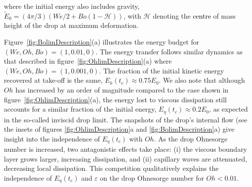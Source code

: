 \documentclass{jfm}
\newcommand{\Ohn}{\mathit{Oh}}
\newcommand{\Wen}{\mathit{We}}
\newcommand{\Bon}{\mathit{Bo}}
\newcommand{\revRev}[1]{\textcolor{black}{#1}}
\begin{document}
\noindent where the initial energy also includes gravity, $\tilde{E}_0 = (4\pi/3)\left(\Wen/2 + \Bon(1-\mathcal{H})\right)$, with $\mathcal{H}$ denoting the \revRev{centre} of mass height of the drop at maximum deformation. 

Figure~\ref{fig:BolimDescription}(a) illustrates the energy budget for $(\Wen, \Ohn, \Bon) = (1, 0.01,0)$. The energy transfer follows similar dynamics as that described in figure~\ref{fig:OhlimDescription}(a) where $(\Wen, \Ohn, \Bon) = (1, 0.001, 0)$. The fraction of the initial kinetic energy recovered at take-off is the same, $E_k(t_c) \approx 0.75 E_0$. We also note that although $\Ohn$ has increased by an order of magnitude compared to the case shown in figure~\ref{fig:OhlimDescription}(a), the energy lost to viscous dissipation still accounts for a similar fraction of the initial energy, $E_\eta(t_c)\approx 0.2 E_0$, as expected in the so-called inviscid drop limit. The snapshots of the drop's internal flow (see the insets of figures \ref{fig:OhlimDescription}a and \ref{fig:BolimDescription}a) give insight into the independence of $E_\eta(t_c)$ with $\Ohn$. As the drop Ohnesorge number is increased, two antagonistic effects take place: (i) the viscous boundary layer grows larger, increasing dissipation, and (ii) capillary waves are attenuated, decreasing local dissipation. This competition qualitatively explains the independence of $E_\eta(t_c)$ and $\varepsilon$ on the drop Ohnesorge number for $\Ohn<0.01$.
\end{document}
